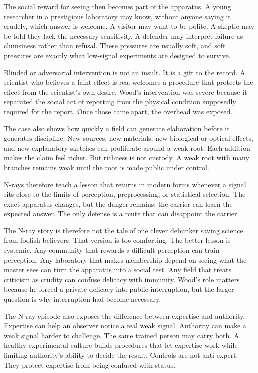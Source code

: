 The social reward for seeing then becomes part of the apparatus. A young
researcher in a prestigious laboratory may know, without anyone saying it
crudely, which answer is welcome. A visitor may want to be polite. A skeptic
may be told they lack the necessary sensitivity. A defender may interpret
failure as clumsiness rather than refusal. These pressures are usually soft,
and soft pressures are exactly what low-signal experiments are designed to
survive.

Blinded or adversarial intervention is not an insult. It is a gift to the
record. A scientist who believes a faint effect is real welcomes a procedure that
protects the effect from the scientist's own desire. Wood's
intervention was severe because it separated the social act of reporting from
the physical condition supposedly required for the report. Once those came
apart, the overhead was exposed.

The case also shows how quickly a field can generate elaboration before it
generates discipline. New sources, new materials, new biological or optical
effects, and new explanatory sketches can proliferate around a weak root. Each
addition makes the claim feel richer. But richness is not custody. A weak
root with many branches remains weak until the root is made public under
control.

N-rays therefore teach a lesson that returns in modern forms whenever a
signal sits close to the limits of perception, preprocessing, or statistical
selection. The exact apparatus changes, but the danger remains: the carrier
can learn the expected answer. The only defense is a route that can disappoint
the carrier.

The N-ray story is therefore not the tale of one clever debunker saving
science from foolish believers. That version is too comforting. The
better lesson is systemic. Any community that rewards a difficult perception
can train perception. Any laboratory that makes membership depend on seeing
what the master sees can turn the apparatus into a social test. Any field
that treats criticism as crudity can confuse delicacy with immunity. Wood's
role matters because he forced a private delicacy into public interruption,
but the larger question is why interruption had become necessary.

The N-ray episode also exposes the difference between expertise and authority.
Expertise can help an observer notice a real weak signal. Authority can make a
weak signal harder to challenge. The same trained person may carry both. A
healthy experimental culture builds procedures that let expertise work while
limiting authority's ability to decide the result. Controls are not
anti-expert. They protect expertise from being confused with status.

